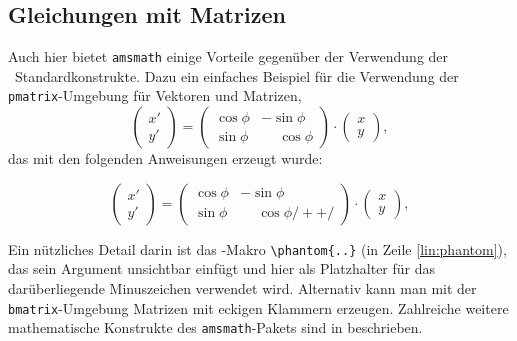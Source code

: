 \subsection{Gleichungen mit Matrizen}

Auch hier bietet \texttt{amsmath} einige Vorteile gegenüber der Verwendung der \latex\ Standardkonstrukte. Dazu ein einfaches Beispiel für die Verwendung der \texttt{pmatrix}-Umgebung für Vektoren und Matrizen,
%
\begin{equation}
\begin{pmatrix} x' \\ y' \end{pmatrix}
= 
\begin{pmatrix}
  \cos \phi & -\sin \phi \\
  \sin \phi & \phantom{-}\cos \phi
\end{pmatrix} 
\cdot
\begin{pmatrix}	x \\ y \end{pmatrix} ,
\end{equation}
%
das mit den folgenden Anweisungen erzeugt wurde:
%
\begin{LaTeXCode}
\begin{equation}
\begin{pmatrix} 
		x' \\ 
		y' 
\end{pmatrix}
= 
\begin{pmatrix}
	  \cos \phi & -\sin \phi \\
	  \sin \phi & \phantom{-}\cos \phi /+ \label{lin:phantom} +/
\end{pmatrix} 
\cdot
\begin{pmatrix} 
		x \\ 
		y 
\end{pmatrix} ,
\end{equation}
\end{LaTeXCode}
%
Ein nützliches Detail darin ist das \tex-Makro \verb!\phantom{..}! (in Zeile \ref{lin:phantom}), das sein Argument unsichtbar einfügt und hier als Platzhalter für das darüberliegende Minuszeichen verwendet wird. Alternativ kann man mit der \texttt{bmatrix}-Umgebung Matrizen mit eckigen Klammern erzeugen.
Zahlreiche weitere mathematische Konstrukte des \texttt{amsmath}-Pakets sind in \cite{amsldoc02} beschrieben.

\begin{comment}
\begin{equation}
\left[ \begin{array}{c}
  x' \\ y'
\end{array} \right] 
= 
\left[ \begin{array}{rr}
	 \cos \phi & \sin \phi \\
	-\sin \phi & \cos \phi
\end{array} \right] 
\cdot
\left[ \begin{array}{c}
	x \\ y
\end{array}
\right] 
.
\end{equation}
\end{comment}



